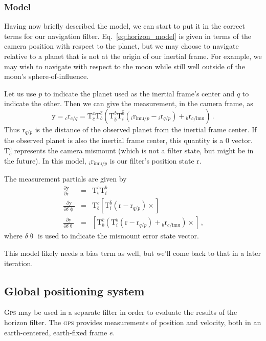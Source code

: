 \documentclass[12pt]{article}
\newcommand{\Tf}[2]{\ensuremath{\mathrm{T}_{#1}^{#2}}}
\newcommand{\skewsymm}[1]{\ensuremath{\left[ #1 \times \right]}}
\newcommand{\vecr}{\ensuremath{\mathrm{r}}}
\newcommand{\vecv}{\ensuremath{\mathrm{v}}}
\newcommand{\vecy}{\ensuremath{\mathrm{y}}}
\begin{document}
\subsubsection{Model}
Having now briefly described the model, we can start to put it in the correct terms for our navigation filter. Eq.~\ref{eq:horizon_model} is given in terms of the camera position with respect to the planet, but we may choose to navigate relative to a planet that is not at the origin of our inertial frame. For example, we may wish to navigate with respect to the moon while still well outside of the moon's sphere-of-influence.

Let us use $p$ to indicate the planet used as the inertial frame's center and $q$ to indicate the other. Then we can give the measurement, in the camera frame, as
\begin{equation}
\vecy = {}_c\vecr_{c/q} = \Tf{\hat{c}}{c} \Tf{b}{\hat{c}} \left( \Tf{\hat{b}}{b} \Tf{i}{\hat{b}} \left({}_i \vecr_{\text{imu}/p} - {}_i \vecr_{q/p} \right) + {}_b \vecr_{c/\text{imu}} \right)\,\text{.}
\end{equation}
Thus $\vecr_{q/p}$ is the distance of the observed planet from the inertial frame center. If the observed planet is also the inertial frame center, this quantity is a 0 vector. \Tf{\hat{c}}{c} represents the camera mismount (which is not a filter state, but might be in the future). In this model, ${}_i \vecr_{\text{imu}/p}$ is our filter's position state $\vecr$.

The measurement partials are given by
\begin{eqnarray}
\frac{\partial\vecy}{\partial\vecr} &=& \Tf{b}{c} \Tf{i}{b} \\
\frac{\partial\vecy}{\partial\delta\upphi} &=& \Tf{b}{c} \skewsymm{%
\Tf{i}{\hat{b}} (\vecr - \vecr_{q/p}) %
 } \\
 \frac{\partial\vecy}{\partial\delta\uptheta} &=& \skewsymm{%
 \Tf{b}{\hat{c}} \left( \Tf{i}{b} (\vecr - \vecr_{q/p}) + {}_b \vecr_{c/\text{imu}} \right) %
 }\,\text{,}
\end{eqnarray}
%
where $\delta\uptheta$ is used to indicate the mismount error state vector.

This model likely needs a bias term as well, but we'll come back to that in a later iteration.

\subsection{Global positioning system}
\textsc{Gps} may be used in a separate filter in order to evaluate the results of the horizon filter. The \textsc{gps} provides measurements of position and velocity, both in an earth-centered, earth-fixed frame $e$.
\end{document}
